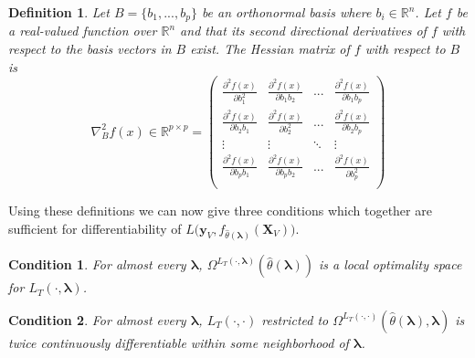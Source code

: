 \documentclass[10pt,letterpaper]{article}
\newtheorem{definition}{Definition}
\newtheorem{condition}{Condition}
\begin{document}
\begin{definition}
Let $B = \{ b_1, ..., b_p \}$ be an orthonormal basis where $b_i \in \mathbb{R}^n$. Let $f$ be a real-valued function over $\mathbb{R}^n$ and that its second directional derivatives of $f$ with respect to the basis vectors in $B$ exist. The Hessian matrix of $f$ with respect to $B$ is
\begin{equation}
\nabla^2_B f(x) \in \mathbb{R}^{p\times p} =
\left (
\begin{array}{cccc}
\frac{\partial^2 f(x)}{\partial b_1^2} & \frac{\partial^2 f(x)}{\partial b_1 b_2} & ...  & \frac{\partial^2 f(x)}{\partial b_1 b_p} \\
\frac{\partial^2 f(x)}{\partial b_2 b_1} & \frac{\partial^2 f(x)}{\partial b_2^2} & ...  & \frac{\partial^2 f(x)}{\partial b_2 b_p} \\
\vdots & \vdots &  \ddots & \vdots \\
\frac{\partial^2 f(x)}{\partial b_p b_1} & \frac{\partial^2 f(x)}{\partial b_p b_2} & ...  & \frac{\partial^2 f(x)}{\partial b_p^2} \\
\end{array}
\right )
\end{equation}
\end{definition}

Using these definitions we can now give three conditions which together are sufficient for differentiability of $L \Big( \boldsymbol{y}_V, f_{\hat{\theta}(\boldsymbol{\lambda})}(\boldsymbol{X}_V) \Big )$.

\begin{condition}
For almost every $\boldsymbol{\lambda}$, $\Omega^{L_T(\cdot, \boldsymbol{\lambda})}(\hat{\theta}\left(\boldsymbol{\lambda}\right))$ is a local optimality space for $L_T\left(\cdot,\boldsymbol{\lambda}\right)$.
\end{condition}

\begin{condition}
For almost every $\boldsymbol{\lambda}$, $L_T\left(\cdot, \cdot\right)$ restricted to $\Omega^{L_T(\cdot, \cdot)}(\hat{\theta}\left(\boldsymbol{\lambda}\right), \boldsymbol{\lambda})$ is twice continuously differentiable within some neighborhood of $\boldsymbol{\lambda}$.
\end{condition}
\end{document}
